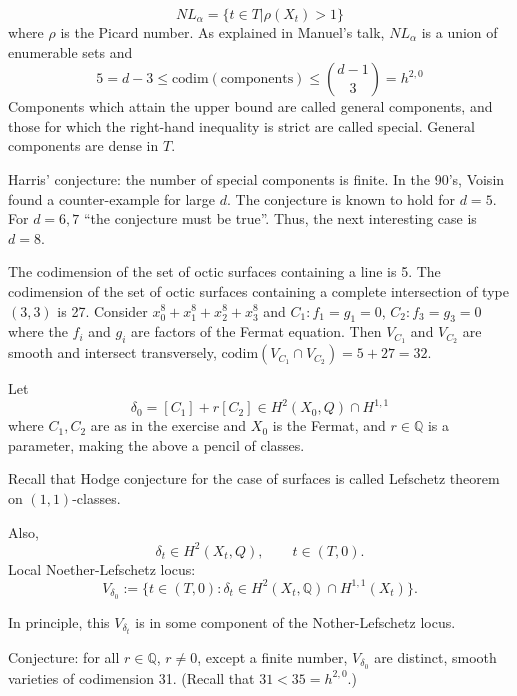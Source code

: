 $$
NL_\alpha
=
\{t \in T|\rho(X_t)>1\}
$$
where $\rho$ is the Picard number.
As explained in Manuel's talk,
$NL_\alpha$ is a union of enumerable
sets and
$$
5=d-3 \leq  \text{codim}(\text{components} )
\leq \binom{d-1}{3}=h^{2,0}
$$
Components which attain the upper bound
are called general components, and those
for which the right-hand inequality
is strict are called special.
General components are dense in $T$.

Harris' conjecture: the number of special
components is finite.
In the 90's, Voisin found a counter-example
for large $d$.
The conjecture is known to hold
for $d=5$. For $d=6,7$ ``the conjecture
must be true''. Thus, the next interesting
case is $d=8$.

\begin{exercise}
\label{exercise-computation-codim}
The codimension of the set of octic
surfaces containing a line is 5.
The codimension of the set of octic surfaces
containing a complete intersection
of type $(3,3)$ is 27.
Consider $x_0^8+x_1^8+x_2^8+x_3^8$
and $C_1:f_1=g_1=0$, $C_2:f_3=g_3=0$ where
the $f_i$ and $g_i$ are factors
of the Fermat equation. Then $V_{C_1}$
and $V_{C_2}$ are smooth and intersect
transversely, $\text{codim}(V_{C_1}\cap
V_{C_2})=5+27=32$.
\end{exercise}

\noindent
Let
$$
\delta_0=[C_1]+r[C_2]
\in H^2(X_0,Q) \cap H^{1,1} 
$$
where $C_1,C_2$ are as in the
exercise and $X_0$ is the Fermat,
and $r \in \mathbb{Q}$ is a parameter,
making the above a pencil of classes. 

Recall that Hodge conjecture for the case
of surfaces is called Lefschetz theorem
on $(1,1)$-classes.

Also,
$$
\delta_t \in H^2(X_t,Q),\qquad 
t \in (T,0).
$$
Local Noether-Lefschetz locus:
$$
V_{\delta_0}:=
\{t \in (T,0):
\delta_t \in H^2(X_t,\mathbb{Q})
\cap H^{1,1}(X_t)\}.
$$

In principle, this $V_{\delta_t}$
is in some component of the
Nother-Lefschetz locus.

\medskip\noindent
Conjecture: for all $r \in \mathbb{Q}$,
$r \neq  0$, except a finite number,
$V_{\delta_0}$ are distinct, smooth
varieties of codimension 31.
(Recall that $31 < 35 = h^{2,0}$.)






































